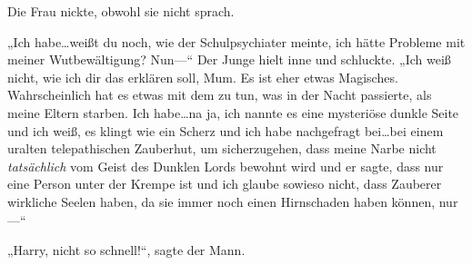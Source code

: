 Die Frau nickte, obwohl sie nicht sprach.

„Ich habe…weißt du noch, wie der Schulpsychiater meinte, ich hätte Probleme mit meiner Wutbewältigung? Nun—“ Der Junge hielt inne und schluckte. „Ich weiß nicht, wie ich dir das erklären soll, Mum. Es ist eher etwas Magisches. Wahrscheinlich hat es etwas mit dem zu tun, was in der Nacht passierte, als meine Eltern starben. Ich habe…na ja, ich nannte es eine mysteriöse dunkle Seite und ich weiß, es klingt wie ein Scherz und ich habe nachgefragt bei…bei einem uralten telepathischen Zauberhut, um sicherzugehen, dass meine Narbe nicht \emph{tatsächlich} vom Geist des Dunklen Lords bewohnt wird und er sagte, dass nur eine Person unter der Krempe ist und ich glaube sowieso nicht, dass Zauberer wirkliche Seelen haben, da sie immer noch einen Hirnschaden haben können, nur—“

„Harry, nicht so schnell!“, sagte der Mann.

